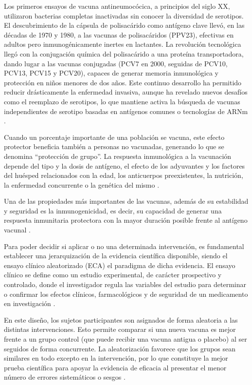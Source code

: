Los primeros ensayos de vacuna antineumocócica, a principios del siglo XX, utilizaron bacterias completas inactivadas sin conocer la diversidad de serotipos. El descubrimiento de la cápsula de polisacárido como antígeno clave llevó, en las décadas de 1970 y 1980, a las vacunas de polisacáridos (PPV23), efectivas en adultos pero inmunogénicamente inertes en lactantes. La revolución tecnológica llegó con la conjugación química del polisacárido a una proteína transportadora, dando lugar a las vacunas conjugadas (PCV7 en 2000, seguidas de PCV10, PCV13, PCV15 y PCV20), capaces de generar memoria inmunológica y protección en niños menores de dos años. Este continuo desarrollo ha permitido reducir drásticamente la enfermedad invasiva, aunque ha revelado nuevos desafíos como el reemplazo de serotipos, lo que mantiene activa la búsqueda de vacunas independientes de serotipo basadas en antígenos comunes o tecnologías de ARNm \cite{Feldman2022}.

Cuando un porcentaje importante de una población se vacuna, este efecto protector beneficia también a personas no vacunadas, generando lo que se denomina “protección de grupo”. La respuesta inmunológica a la vacunación depende del tipo y la dosis de antígeno, el efecto de los adyuvantes y los factores del huésped relacionados con la edad, los anticuerpos preexistentes, la nutrición, la enfermedad concurrente o la genética del mismo \cite{aep2026}.

Una de las propiedades más importantes de las vacunas, además de su estabilidad y seguridad es la inmunogenicidad, es decir, su capacidad de generar una respuesta inmunitaria protectora con la mayor duración posible frente al antígeno vacunal \cite{aep2026}.

Para poder decidir si aplicar o no una determinada intervención, es fundamental establecer una jerarquización de la evidencia científica disponible, siendo el ensayo clínico aleatorizado (ECA) el paradigma de dicha evidencia. El ensayo clínico se define como un estudio experimental, de carácter prospectivo y controlado, donde el investigador regula las variables del estudio para determinar o confirmar los efectos clínicos, farmacológicos y de seguridad de un medicamento en investigación \cite{aep2026}.

En este diseño, los sujetos participantes son asignados de forma aleatoria a las distintas intervenciones. Esto permite comparar si una nueva vacuna es mejor frente a un grupo control (que puede recibir una vacuna antigua o placebo) al ser seguidos de forma concurrente. La aleatorización favorece que los grupos sean similares en todo excepto en la intervención, por lo que constituye la mejor prueba científica para apoyar la evidencia de eficacia al presentar el menor número de errores sistemáticos o sesgos \cite{aep2026}.

